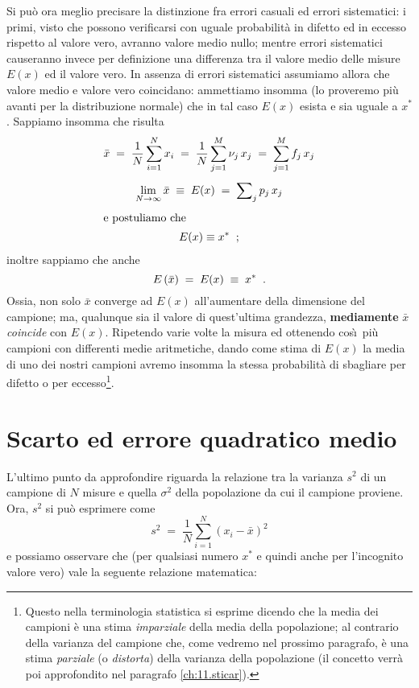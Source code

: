 Si pu\`o ora meglio precisare la distinzione fra errori
casuali ed errori sistematici: i primi,%
visto che possono verificarsi con uguale probabilit\`a in
difetto ed in eccesso rispetto al valore vero, avranno
valore medio nullo; mentre errori sistematici%
causeranno invece per definizione una differenza tra il
valore medio delle misure $E(x)$ ed il valore vero.  In
assenza di errori sistematici assumiamo allora che valore
medio e valore vero coincidano: ammettiamo insomma (lo
proveremo pi\`u avanti per la distribuzione normale) che in
tal caso $E(x)$ esista e sia uguale a $x^*$.  Sappiamo
insomma che risulta
\begin{gather*}
  \bar x \; = \; \frac{1}{N} \sum_{i=1}^N x_i
    \; = \; \frac{1}{N} \sum_{j=1}^M \nu_j \, x_j
    \; = \; \sum_{j=1}^M f_j \, x_j \\[1ex]
  \lim_{N \rightarrow \infty} \bar x \; \equiv \;
    E(x) \; = \; \sum\nolimits_j p_j \, x_j \\[1ex]
  \intertext{e postuliamo che}
  E(x) \equiv x^* \;\; ;
\end{gather*}
inoltre sappiamo che anche
\begin{equation*}
  E \left( \bar x \right) \; = \; E(x) \; \equiv \; x^* \;\;
  .
\end{equation*}
Ossia, non solo $\bar x$ converge ad $E(x)$ all'aumentare
della dimensione del campione; ma, qualunque sia il valore
di quest'ultima grandezza, \textbf{mediamente} $\bar x$
\emph{coincide} con $E(x)$.  Ripetendo varie volte la misura
ed ottenendo cos\`\i\ pi\`u campioni con differenti medie
aritmetiche, dando come stima di $E(x)$ la media di uno dei
nostri campioni avremo insomma la stessa probabilit\`a di
sbagliare per difetto o per eccesso\/\footnote{Questo nella
  terminologia statistica si esprime dicendo che la media
  dei campioni \`e una stima \emph{imparziale}%
  della media della popolazione; al contrario della varianza
  del campione che, come vedremo nel prossimo paragrafo, \`e
  una stima \emph{parziale} (o \emph{distorta}) della
  varianza della popolazione (il concetto verr\`a poi
  approfondito nel paragrafo \ref{ch:11.sticar}).}.%

\section{Scarto ed errore quadratico medio}%
%
\label{ch:5.scedeqm}
L'ultimo punto da approfondire riguarda la relazione tra la
varianza $s^2$ di un campione di $N$ misure e quella
$\sigma^2$ della popolazione da cui il campione proviene.
Ora, $s^2$ si pu\`o esprimere come
\begin{equation*}
  s^2 \; = \; \frac{1}{N} \sum_{i=1}^N \left( x_i -
    \bar x \right) ^2
\end{equation*}
e possiamo osservare che (per qualsiasi numero $x^*$ e
quindi anche per l'incognito valore vero) vale la seguente
relazione matematica:

